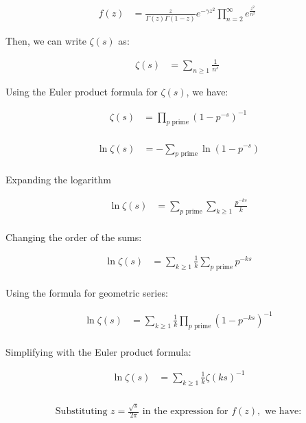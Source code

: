 \documentclass{article}
\begin{document}
\begin{align*}
f(z) &= \frac{z}{\Gamma(z)\Gamma(1-z)}e^{-\gamma z^2} \prod_{n=2}^{\infty} e^{\frac{z^2}{n^2}} \
\end{align*}

Then, we can write $\zeta(s)$ as:

\begin{align*}
\zeta(s) &= \sum_{n\geq 1} \frac{1}{n^s} \
\end{align*}

Using the Euler product formula for $\zeta(s)$, we have:

\begin{align*}
\zeta(s) &= \prod_{p \text{ prime}} \left(1 - p^{-s}\right)^{-1} \\
\end{align*}

\begin{align*}
\ln \zeta(s) &= -\sum_{p \text{ prime}} \ln(1-p^{-s}) \\
\end{align*}

Expanding the logarithm

\begin{align*}
\ln \zeta(s) &= \sum_{p \text{ prime}} \sum_{k \geq 1} \frac{p^{-ks}}{k} \\
\end{align*}

Changing the order of the sums:

\begin{align*}
\ln \zeta(s) &= \sum_{k \geq 1} \frac{1}{k} \sum_{p \text{ prime}} p^{-ks} \\
\end{align*}

Using the formula for geometric series:

\begin{align*}
\ln \zeta(s) &= \sum_{k \geq 1} \frac{1}{k} \prod_{p \text{ prime}} (1-p^{-ks})^{-1} \\
\end{align*}

Simplifying with the Euler product formula:

\begin{align*}
\ln \zeta(s) &= \sum_{k \geq 1} \frac{1}{k} \zeta(ks)^{-1} \\
\end{align*}

\begin{align*}
\text{Substituting } z = \frac{\sqrt{s}}{2\pi} \text{ in the expression for } f(z), \text{ we have:} \\
\end{align*}
\end{document}
